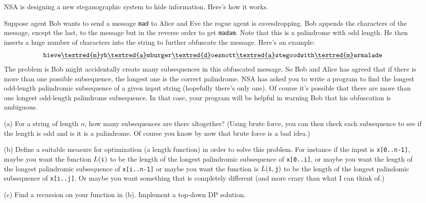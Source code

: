 NSA is designing a new steganographic system to hide information.
Here's how it works.

Suppose agent Bob wants to send a message \verb!mad! to Alice
and Eve the rogue agent is eavesdropping.
Bob appends the characters of the message, except the last,
to the message but in the reverse order to get \verb!madam!.
Note that this is a palindrome with odd length.
He then inserts a huge number of characters into the string to further
obfuscate the message.
Here's an example:
\[
  \texttt{hieve\underline{\textred{m}}yh\underline{\textred{a}}mburger\underline{\textred{d}}oesnott\underline{\textred{a}}stegoodwith\underline{\textred{m}}armalade}
\]
The problem is Bob might accidentally create many subsequences in
this obfuscated message.
So Bob and Alice has agreed that if there is more than one
possible subsequence, the longest one is the correct palindrome.
NSA has asked you to write a program  
to find the longest odd-length palindromic subsequence
of a given input string (hopefully there's only one).
Of course it's possible that there are more than one longest odd-length
palindrome subsequence.
In that case, your program will be helpful in warning Bob that his obfuscation is ambiguous.

(a) For a string of length $n$, how many subsequences are there altogether?
(Using brute force, you can then check each subsequence to see if the
length is odd and is it is a palindrome. Of course you know by now that brute force is a bad idea.)

(b) Define a suitable measure for optimization (a length function)
in order to solve this problem.
For instance if the input is \verb!x[0..n-1]!, maybe
you want the function $L(\verb!i!)$ to be the length of the longest palindromic
subsequence of \verb!x[0..i]!, or maybe
you want the length of the longest palindromic
subsequence of \verb!x[i..n-1]!
or maybe you want
the function is $L(\verb!i!, \verb!j!)$ to be the length of the longest
palindomic subsequence of \verb!x[i..j]!.
Or maybe you want something that is completely different (and more
crazy than what I can think of.)

(c)
Find a recursion on your function in (b).
Implement a top-down DP solution.

